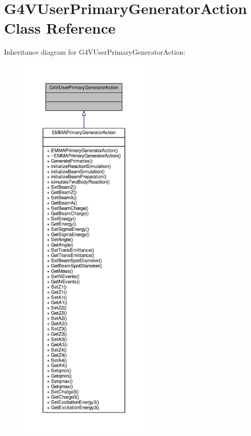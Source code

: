 \hypertarget{classG4VUserPrimaryGeneratorAction}{}\section{G4\+V\+User\+Primary\+Generator\+Action Class Reference}
\label{classG4VUserPrimaryGeneratorAction}


Inheritance diagram for G4\+V\+User\+Primary\+Generator\+Action\+:
\nopagebreak
\begin{figure}[H]
\begin{center}
\leavevmode
\includegraphics[height=550pt]{classG4VUserPrimaryGeneratorAction__inherit__graph}
\end{center}
\end{figure}


